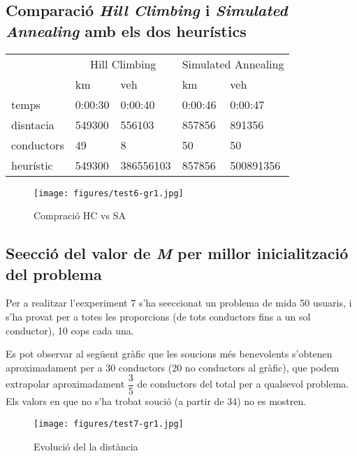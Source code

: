 \subsection{Comparació \emph{Hill Climbing} i \emph{Simulated Annealing} amb els dos heurístics}



\begin{center}
\begin{tabular}{l|llll}
 & \multicolumn{2}{c}{Hill Climbing} & \multicolumn{2}{c}{Simulated Annealing}\\
           & km       & veh       & km        & veh\\
\hline
temps      & 0:00:30  &  0:00:40  &  0:00:46  &  0:00:47\\
disntacia  & 549300   & 556103    &  857856   & 891356\\
conductors & 49       & 8         & 50        & 50\\
heurístic  & 549300   & 386556103 & 857856    & 500891356
\end{tabular}
\end{center}

\begin{figure}[H]
\begin{center}
 \texttt{[image: figures/test6-gr1.jpg]}
 \label{test6-gr1}
\caption{Compració HC vs SA}
\end{center}
\end{figure}


\subsection{Se\lgem ecció del valor de \emph{M} per millor inicialització del problema}
Per a realitzar l'eexperiment 7 s'ha se\lgem eccionat un problema de mida 50 usuaris, i s'ha provat per a totes les proporcions
(de tots conductors fins a un sol conductor), 10 cops cada una.

Es pot observar al següent gràfic que les so\lgem ucions més benevolents s'obtenen aproximadament per a 30 conductors (20 no conductors al gràfic),
que podem extrapolar aproximadament $\dfrac{3}{5}$ de conductors del total per a qualsevol problema.
Els valors en que no s'ha trobat so\lgem ució (a partir de 34) no es mostren.

\begin{figure}[H]
\begin{center}
 \texttt{[image: figures/test7-gr1.jpg]}
 \label{test7-gr2}
\end{center}
\caption{Evolució del la distància}
\end{figure}

